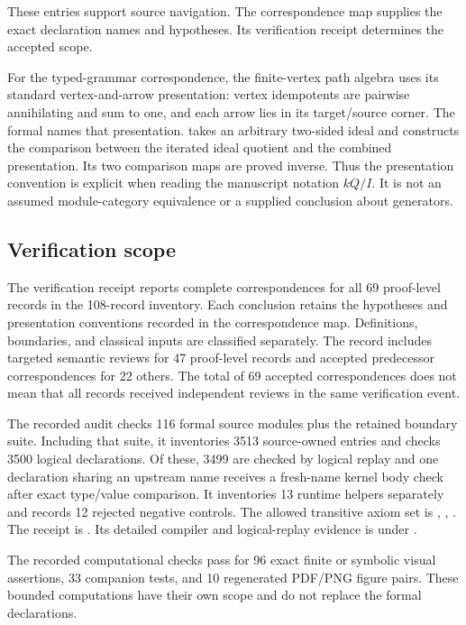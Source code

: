 These entries support source navigation. The correspondence map supplies the exact declaration names and hypotheses. Its verification receipt determines the accepted scope.

For the typed-grammar correspondence, the finite-vertex path algebra uses its standard vertex-and-arrow presentation: vertex idempotents are pairwise annihilating and sum to one, and each arrow lies in its target/source corner. The formal  names that presentation.  takes an arbitrary two-sided ideal and constructs the comparison between the iterated ideal quotient and the combined presentation. Its two comparison maps are proved inverse. Thus the presentation convention is explicit when reading the manuscript notation $kQ/I$. It is not an assumed module-category equivalence or a supplied conclusion about generators.



\subsection{Verification scope}

The verification receipt reports complete correspondences for all 69 proof-level records in the 108-record inventory. Each conclusion retains the hypotheses and presentation conventions recorded in the correspondence map. Definitions, boundaries, and classical inputs are classified separately. The record includes targeted semantic reviews for 47 proof-level records and accepted predecessor correspondences for 22 others. The total of 69 accepted correspondences does not mean that all records received independent reviews in the same verification event.

The recorded audit checks 116 formal source modules plus the retained boundary suite. Including that suite, it inventories 3513 source-owned entries and checks 3500 logical declarations. Of these, 3499 are checked by logical replay and one declaration sharing an upstream name receives a fresh-name kernel body check after exact type/value comparison. It inventories 13 runtime helpers separately and records 12 rejected negative controls. The allowed transitive axiom set is , , . The receipt is . Its detailed compiler and logical-replay evidence is under .

The recorded computational checks pass for 96 exact finite or symbolic visual assertions, 33 companion tests, and 10 regenerated PDF/PNG figure pairs. These bounded computations have their own scope and do not replace the formal declarations.

